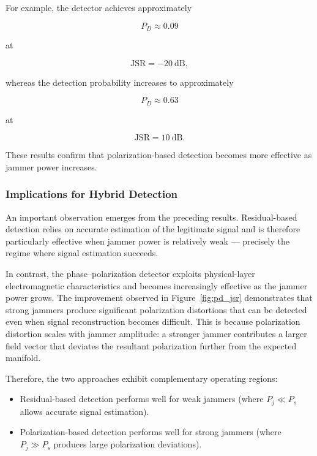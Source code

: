 \documentclass{article}
\begin{document}
For example, the detector achieves approximately

\begin{equation}
P_D \approx 0.09
\end{equation}

at

\begin{equation}
\mathrm{JSR}=-20~\mathrm{dB},
\end{equation}

whereas the detection probability increases to approximately

\begin{equation}
P_D \approx 0.63
\end{equation}

at

\begin{equation}
\mathrm{JSR}=10~\mathrm{dB}.
\end{equation}

These results confirm that polarization-based detection becomes more
effective as jammer power increases.

\subsubsection{Implications for Hybrid Detection}

An important observation emerges from the preceding results.
Residual-based detection relies on accurate estimation of the legitimate
signal and is therefore particularly effective when jammer power is
relatively weak — precisely the regime where signal estimation succeeds.

In contrast, the phase--polarization detector exploits physical-layer
electromagnetic characteristics and becomes increasingly effective as the
jammer power grows. The improvement observed in
Figure~\ref{fig:pd_jsr} demonstrates that strong jammers produce
significant polarization distortions that can be detected even when
signal reconstruction becomes difficult. This is because polarization distortion scales with jammer amplitude: a stronger jammer contributes a larger field vector that deviates the resultant polarization further from the expected manifold.

Therefore, the two approaches exhibit complementary operating regions:

\begin{itemize}
\item Residual-based detection performs well for weak jammers (where $P_j \ll P_s$ allows accurate signal estimation).
\item Polarization-based detection performs well for strong jammers (where $P_j \gg P_s$ produces large polarization deviations).
\end{itemize}
\end{document}
